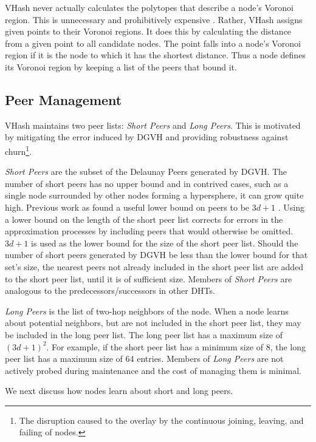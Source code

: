 \documentclass[10pt, conference, letterpaper]{IEEEtran}
\begin{document}
VHash never actually calculates the polytopes that describe a node's Voronoi region.
This is unnecessary and prohibitively expensive \cite{raynet}.
Rather, VHash assigns given points to their Voronoi regions.
It does this by calculating the distance from a given point to all candidate nodes.
The point falls into a node's Voronoi region if it is the node to which it has the shortest distance.
Thus a node defines its Voronoi region by keeping a list of the peers that bound it.

\subsection{Peer Management}
VHash maintains two peer lists: \textit{Short Peers} and \textit{Long Peers}.
This is motivated by mitigating the error induced by DGVH and providing robustness against churn\footnote{The disruption caused to the overlay by the continuous joining, leaving, and failing of nodes.}.

\textit{Short Peers} are the subset of the Delaunay Peers generated by DGVH. 
The number of short peers has no upper bound and in contrived cases, such as a single node surrounded by other nodes forming a hypersphere, it can grow quite high.
Previous work as found a useful lower bound on peers to be $3d + 1$ \cite{raynet}.
Using a lower bound on the length of the short peer list corrects for errors in the approximation processes by including peers that would otherwise be omitted. 
$3d+1$ is used as the lower bound for the size of the short peer list.
Should the number of short peers generated by DGVH be less than the lower bound for that set's size, the nearest peers not already included in the short peer list are added to the short peer list, until it is of sufficient size.
Members of \textit{Short Peers} are analogous to the predecessors/successors in other DHTs.

\textit{Long Peers} is the list of two-hop neighbors of the node.
When a node learns about potential neighbors, but are not included in the short peer list, they may be included in the long peer list.  
The long peer list has a maximum size of $(3d+1)^2$.  
For example, if the short peer list has a minimum size of 8, the long peer list has a maximum size of 64 entries.  
Members of \textit{Long Peers} are not actively probed during maintenance and the cost of managing them is minimal.

We next discuss how nodes learn about short and long peers.
\end{document}

